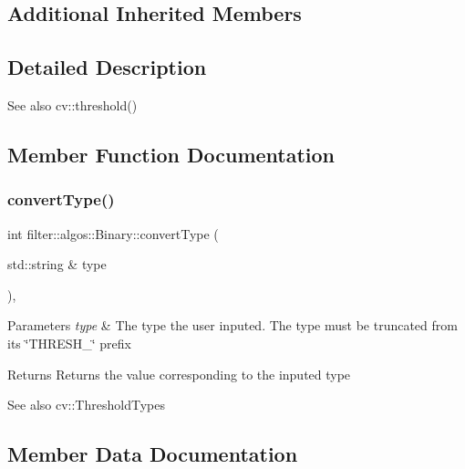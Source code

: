 \subsection*{Additional Inherited Members}


\subsection{Detailed Description}
\begin{DoxySeeAlso}{See also}
cv\+::threshold() 
\end{DoxySeeAlso}


\subsection{Member Function Documentation}
\mbox{\label{classfilter_1_1algos_1_1_binary_a5c2003f1c00b4ae15430ecf42a1cb252}} 
\subsubsection{\texorpdfstring{convert\+Type()}{convertType()}}
{\footnotesize\ttfamily int filter\+::algos\+::\+Binary\+::convert\+Type (\begin{DoxyParamCaption}\item[{std\+::string \&}]{type }\end{DoxyParamCaption})\hspace{0.3cm}{\ttfamily [inline]}, {\ttfamily [private]}}


\begin{DoxyParams}{Parameters}
{\em type} & The type the user inputed. The type must be truncated from its \char`\"{}\+T\+H\+R\+E\+S\+H\+\_\+\char`\"{} prefix \\
\hline
\end{DoxyParams}
\begin{DoxyReturn}{Returns}
Returns the value corresponding to the inputed type 
\end{DoxyReturn}
\begin{DoxySeeAlso}{See also}
cv\+::\+Threshold\+Types 
\end{DoxySeeAlso}


\subsection{Member Data Documentation}
\mbox{\label{classfilter_1_1algos_1_1_binary_a35c09786deafa16fb4053f895c2471b3}} 

